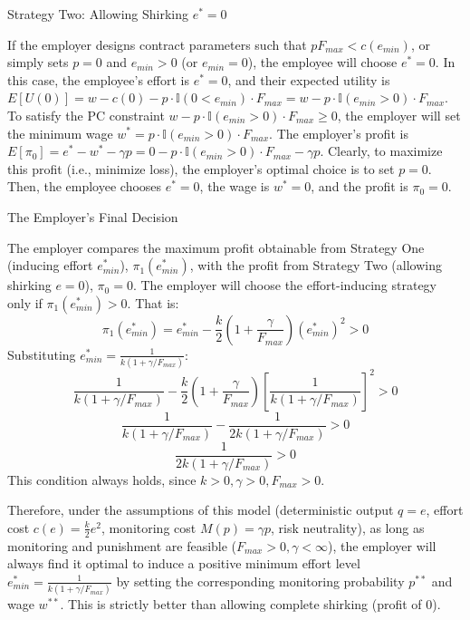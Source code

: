 {Strategy Two: Allowing Shirking $e^* = 0$}

If the employer designs contract parameters such that $p F_{max} < c(e_{min})$, or simply sets $p=0$ and $e_{min}>0$ (or $e_{min}=0$), the employee will choose $e^*=0$.
In this case, the employee's effort is $e^*=0$, and their expected utility is $E[U(0)] = w - c(0) - p \cdot \mathbb{I}(0 < e_{min}) \cdot F_{max} = w - p \cdot \mathbb{I}(e_{min}>0) \cdot F_{max}$.
To satisfy the PC constraint $w - p \cdot \mathbb{I}(e_{min}>0) \cdot F_{max} \ge 0$, the employer will set the minimum wage $w^* = p \cdot \mathbb{I}(e_{min}>0) \cdot F_{max}$.
The employer's profit is $E[\pi_0] = e^* - w^* - \gamma p = 0 - p \cdot \mathbb{I}(e_{min}>0) \cdot F_{max} - \gamma p$.
Clearly, to maximize this profit (i.e., minimize loss), the employer's optimal choice is to set $p=0$. Then, the employee chooses $e^*=0$, the wage is $w^*=0$, and the profit is $\pi_0 = 0$.

{The Employer's Final Decision}

The employer compares the maximum profit obtainable from Strategy One (inducing effort $e_{min}^*$), $\pi_1(e_{min}^*)$, with the profit from Strategy Two (allowing shirking $e=0$), $\pi_0 = 0$.
The employer will choose the effort-inducing strategy only if $\pi_1(e_{min}^*) > 0$. That is:
\begin{equation}
\pi_1(e_{min}^*) = e_{min}^* - \frac{k}{2} \left( 1 + \frac{\gamma}{F_{max}} \right) (e_{min}^*)^2 > 0
\end{equation}
Substituting $e_{min}^* = \frac{1}{k(1 + \gamma/F_{max})}$:
\begin{equation}
\frac{1}{k(1 + \gamma/F_{max})} - \frac{k}{2} \left( 1 + \frac{\gamma}{F_{max}} \right) \left[ \frac{1}{k(1 + \gamma/F_{max})} \right]^2 > 0
\end{equation}
\begin{equation}
\frac{1}{k(1 + \gamma/F_{max})} - \frac{1}{2k(1 + \gamma/F_{max})} > 0
\end{equation}
\begin{equation}
\frac{1}{2k(1 + \gamma/F_{max})} > 0
\end{equation}
This condition always holds, since $k>0, \gamma>0, F_{max}>0$.

Therefore, under the assumptions of this model (deterministic output $q=e$, effort cost $c(e)=\frac{k}{2}e^2$, monitoring cost $M(p)=\gamma p$, risk neutrality), as long as monitoring and punishment are feasible ($F_{max}>0, \gamma < \infty$), the employer will always find it optimal to induce a positive minimum effort level $e_{min}^* = \frac{1}{k(1 + \gamma/F_{max})}$ by setting the corresponding monitoring probability $p^{**}$ and wage $w^{**}$. This is strictly better than allowing complete shirking (profit of 0).

